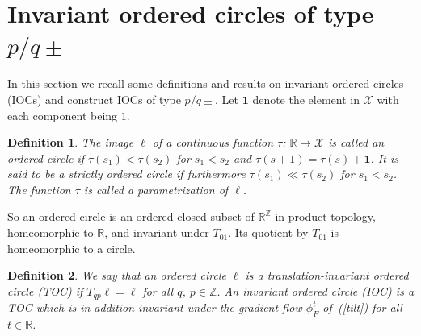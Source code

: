 \documentclass[12pt]{article}
\newcommand{\R}{\mathbb{R}}
\newcommand{\Z}{\mathbb{Z}}
\newcounter{number}
\newtheorem{definition}{Definition}
\newcommand{\begde}{\begin{definition}\hspace{1em}}
\newcommand{\ede}{\end{definition}
                           \addtocounter{number}{1}}
\newcommand{\newsection}[1]{    \section{#1}
                               \setcounter{equation}{0}
                                \setcounter{number}{1} }
\newcommand{\refer}[1]{~(\ref{#1})}
\newcommand{\one}{{\mathbf{1}}}
\begin{document}







\newsection{Invariant ordered circles of type $p/q\pm$}\label{sec:p/q+}
In this section we recall some definitions and results on invariant ordered circles (IOCs) and construct IOCs of type $p/q\pm$. Let $\one$ denote the element in $\mathcal{X}$ with each component being $1$.

\begde\label{defOC}
  The image $\ell$ of a continuous function $\tau$:  $\R\mapsto\mathcal{X}$ is called an {\em ordered circle} if $\tau(s_1)< \tau(s_2)$ for $s_1<s_2$ and $\tau(s+1)=\tau(s)+\one$. It is said to be a {\em strictly ordered circle} if
   furthermore $\tau(s_1)\ll \tau(s_2)$ for $s_1<s_2$. The function $\tau$ is called a parametrization of $\ell$.
  \ede

So an {ordered circle} is an ordered closed subset of $\R^\Z$ in product topology, homeomorphic to $\R$, and invariant under $T_{01}$. Its quotient by $T_{01}$ is homeomorphic to a circle.

\begde\label{defIOC}
We say that an ordered circle $\ell$ is a
 {\em translation-invariant ordered circle} (TOC) if $T_{qp}\ell=\ell$ for all $q$, $p\in\Z$.
An {\em invariant ordered circle} (IOC) is a TOC which is in addition invariant under the gradient flow $\phi_F^t$ of\refer{tilt} for all $t\in\R$.
\ede
\end{document}
